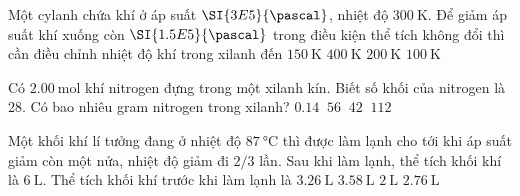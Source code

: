 \begin{ex}
Một cylanh chứa khí ở áp suất $\SI{3E5}{\pascal}$, nhiệt độ $\SI{300}{\kelvin}$. Để giảm áp suất khí xuống còn $\SI{1.5E5}{\pascal}$ trong điều kiện thể tích không đổi thì cần điều chỉnh nhiệt độ khí trong xilanh đến
	\choice
	{\True $\SI{150}{\kelvin}$}
	{$\SI{400}{\kelvin}$}
	{$\SI{200}{\kelvin}$}
	{$\SI{100}{\kelvin}$}
\end{ex}
\begin{ex}
	Có $\SI{2.00}{\mole}$ khí nitrogen đựng trong một xilanh kín. Biết số khối của nitrogen là 28. Có bao nhiêu gram nitrogen trong xilanh?
	\choice
	{$\SI{0.14}{}$}
	{\True $\SI{56}{}$}
	{$\SI{42}{}$}
	{$\SI{112}{}$}
\end{ex}
\begin{ex}
	Một khối khí lí tưởng đang ở nhiệt độ $\SI{87}{\celsius}$ thì được làm lạnh cho tới khi áp suất giảm còn một nửa, nhiệt độ giảm đi $2/3$ lần. Sau khi làm lạnh, thể tích khối khí là $\SI{6}{\liter}$. Thể tích khối khí trước khi làm lạnh là
	\choice
	{ $\SI{3.26}{\liter}$}
	{\True$\SI{3.58}{\liter}$}
	{$\SI{2}{\liter}$}
	{$\SI{2.76}{\liter}$}
\end{ex}
